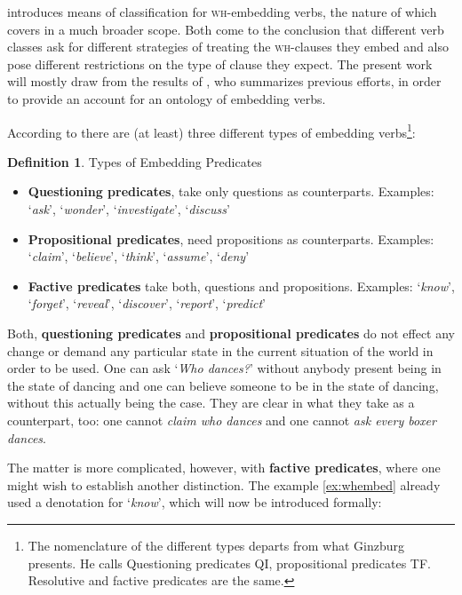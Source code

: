 \documentclass[a4paper]{article}
\newcommand{\term}[1]{\textsf{\textbf{#1}}} %
\newcommand{\example}[1]{`\textit{#1}'} %
\newcommand{\wh}{\textsc{wh}}
\theoremstyle{remark}
\theoremstyle{remark}
\theoremstyle{definition}
\newtheorem{definition}[thm]{Definition}
\theoremstyle{definition}
\begin{document}
\cite{karttunen:1977} introduces means of classification for \wh-embedding
verbs, the nature of which \cite{lahiri:diss} covers in a much broader scope.
Both come to the conclusion that different verb classes ask for different
strategies of treating the \wh-clauses they embed and also pose different
restrictions on the type of clause they expect. The present work will mostly
draw from the results of \cite{ginzburg}, who summarizes previous efforts,
in order to provide an account for an ontology of embedding verbs.

According to \cite{ginzburg} there are (at least) three different types of
embedding verbs\footnote{The nomenclature of the different types departs from
what Ginzburg presents. He calls Questioning predicates QI, propositional
predicates TF. Resolutive and factive predicates are the same.}:

\begin{definition}\label{def:embed1}
  Types of Embedding Predicates
\begin{itemize}
  \item \term{Questioning predicates}, take only questions as counterparts.
  Examples: \example{ask}, \example{wonder}, \example{investigate},
  \example{discuss}
  \item \term{Propositional predicates}, need propositions as counterparts.
  Examples: \example{claim}, \example{believe}, \example{think},
  \example{assume}, \example{deny}
  \item \term{Factive predicates} take both, questions and propositions.
  Examples:
  \example{know}, \example{forget}, \example{reveal}, \example{discover},
  \example{report}, \example{predict}
\end{itemize}
\end{definition}

Both, \term{questioning predicates} and \term{propositional predicates} do not
effect any change or demand any particular state in the current situation of the
world in order to be used. One can ask \example{Who dances?} without anybody
present being in the state of dancing and one can believe someone to be in the
state of dancing, without this actually being the case. They are clear in what
they take as a counterpart, too: one cannot \emph{claim who dances} and one
cannot \emph{ask every boxer dances}.

The matter is more complicated, however, with \term{factive predicates}, where
one might wish to establish another distinction. The example
\ref{ex:whembed} already used a denotation for \example{know}, which will now be
introduced formally:
\end{document}
